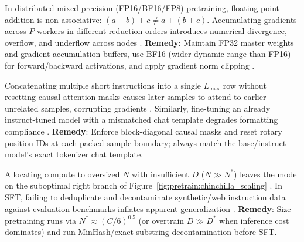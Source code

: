 \documentclass[../../../../master.tex]{subfiles}
\begin{document}
\begin{pitfall}
In distributed mixed-precision (FP16/BF16/FP8) pretraining, floating-point addition is non-associative: $(a+b)+c \neq a+(b+c)$. Accumulating gradients across $P$ workers in different reduction orders introduces numerical divergence, overflow, and underflow across nodes . \textbf{Remedy}: Maintain FP32 master weights and gradient accumulation buffers, use BF16 (wider dynamic range than FP16) for forward/backward activations, and apply gradient norm clipping .
\end{pitfall}

\begin{pitfall}
Concatenating multiple short instructions into a single $L_{\max}$ row without resetting causal attention masks causes later samples to attend to earlier unrelated samples, corrupting gradients . Similarly, fine-tuning an already instruct-tuned model with a mismatched chat template degrades formatting compliance . \textbf{Remedy}: Enforce block-diagonal causal masks and reset rotary position IDs at each packed sample boundary; always match the base/instruct model's exact tokenizer chat template.
\end{pitfall}

\begin{pitfall}
Allocating compute to oversized $N$ with insufficient $D$ ($N \gg N^*$) leaves the model on the suboptimal right branch of Figure~\ref{fig:pretrain:chinchilla_scaling} . In SFT, failing to deduplicate and decontaminate synthetic/web instruction data against evaluation benchmarks inflates apparent generalization . \textbf{Remedy}: Size pretraining runs via $N^* \approx (C/6)^{0.5}$ (or overtrain $D \gg D^*$ when inference cost dominates) and run MinHash/exact-substring decontamination before SFT.
\end{pitfall}
\end{document}
